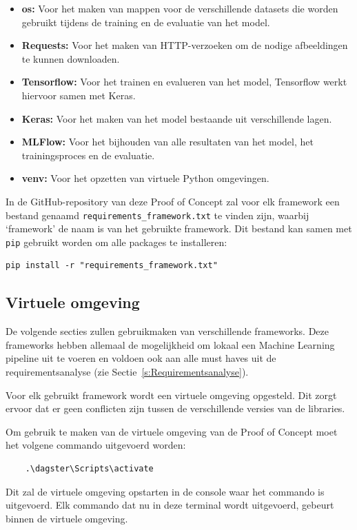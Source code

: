 \begin{itemize}
    \item \textbf{os:} Voor het maken van mappen voor de verschillende datasets die worden gebruikt tijdens de training en de evaluatie van het model.
    \item \textbf{Requests:} Voor het maken van HTTP-verzoeken om de nodige afbeeldingen te kunnen downloaden.
    \item \textbf{Tensorflow:} Voor het trainen en evalueren van het model, Tensorflow werkt hiervoor samen met Keras.
    \item \textbf{Keras:} Voor het maken van het model bestaande uit verschillende lagen.
    \item \textbf{MLFlow:} Voor het bijhouden van alle resultaten van het model, het trainingsproces en de evaluatie.
    \item \textbf{venv:} Voor het opzetten van virtuele Python omgevingen.
\end{itemize}


In de GitHub-repository van deze Proof of Concept zal voor elk framework een bestand genaamd \texttt{requirements\_framework.txt} te vinden zijn, waarbij `framework' de naam is van het gebruikte framework. Dit bestand kan samen met \texttt{pip} gebruikt worden om alle packages te installeren:

\begin{verbatim}
pip install -r "requirements_framework.txt"
\end{verbatim}

\subsection{Virtuele omgeving}

De volgende secties zullen gebruikmaken van verschillende frameworks. Deze frameworks hebben allemaal de mogelijkheid om lokaal een Machine Learning pipeline uit te voeren en voldoen ook aan alle must haves uit de requirementsanalyse (zie Sectie~\ref{s:Requirementsanalyse}).

Voor elk gebruikt framework wordt een virtuele omgeving opgesteld. Dit zorgt ervoor dat er geen conflicten zijn tussen de verschillende versies van de libraries.

Om gebruik te maken van de virtuele omgeving van de Proof of Concept moet het volgene commando uitgevoerd worden:

\begin{verbatim}
    .\dagster\Scripts\activate
\end{verbatim}

Dit zal de virtuele omgeving opstarten in de console waar het commando is uitgevoerd. Elk commando dat nu in deze terminal wordt uitgevoerd, gebeurt binnen de virtuele omgeving.





